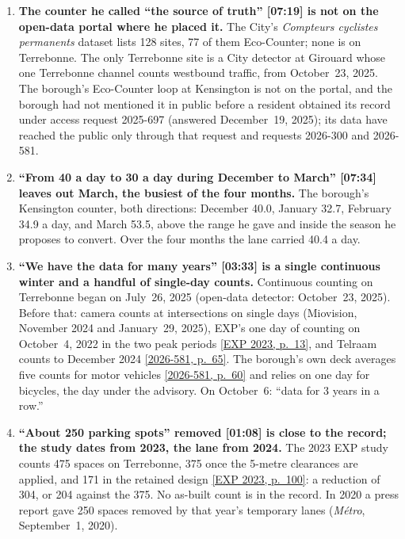 \documentclass[10pt,letterpaper]{article}
\newcommand{\repourl}{https://github.com/OpenMobilityData/Terrebonne-open-sources}
\newcommand{\pagesurl}{https://openmobilitydata.github.io/Terrebonne-access-requests}
\newcommand{\cliptime}[1]{\textsf{\small[#1]}}
\newcommand{\pgl}[2]{\href{\pagesurl/2026-581/raw/01_emails_mandate_counts.pdf\#page=#1}{\textsf{\small[2026-581, p.~#2]}}}
\newcommand{\pg}[1]{\pgl{#1}{#1}}
\newcommand{\exppg}[1]{\href{\repourl/blob/main/2023-exp-mobility-study/raw/EXP_Etude_de_mobilite_rue_de_Terrebonne_2023.pdf}{\textsf{\small[EXP 2023, p.~#1]}}}
\begin{document}
\begin{enumerate}[nosep,itemsep=0.3em,leftmargin=1.4em]
  \item \begin{minipage}[t]{\linewidth}\textbf{The counter he called ``the source of truth'' \cliptime{07:19} is not on the open-data portal where he placed it.} The City's \emph{Compteurs cyclistes permanents} dataset lists 128 sites, 77 of them Eco-Counter; none is on Terrebonne. The only Terrebonne site is a City detector at Girouard whose one Terrebonne channel counts westbound traffic, from October~23, 2025. The borough's Eco-Counter loop at Kensington is not on the portal, and the borough had not mentioned it in public before a resident obtained its record under access request 2025-697 (answered December~19, 2025); its data have reached the public only through that request and requests 2026-300 and 2026-581.\end{minipage}\vspace{0.35em}
  \item \begin{minipage}[t]{\linewidth}\textbf{``From 40 a day to 30 a day during December to March'' \cliptime{07:34} leaves out March, the busiest of the four months.} The borough's Kensington counter, both directions: December 40.0, January 32.7, February 34.9 a day, and March 53.5, above the range he gave and inside the season he proposes to convert. Over the four months the lane carried 40.4 a day.\end{minipage}\vspace{0.35em}
  \item \begin{minipage}[t]{\linewidth}\textbf{``We have the data for many years'' \cliptime{03:33} is a single continuous winter and a handful of single-day counts.} Continuous counting on Terrebonne began on July~26, 2025 (open-data detector: October~23, 2025). Before that: camera counts at intersections on single days (Miovision, November 2024 and January~29, 2025), EXP's one day of counting on October~4, 2022 in the two peak periods \exppg{13}, and Telraam counts to December 2024 \pg{65}. The borough's own deck averages five counts for motor vehicles \pg{60} and relies on one day for bicycles, the day under the advisory. On October~6: ``data for 3 years in a row.''\end{minipage}\vspace{0.35em}
  \item \begin{minipage}[t]{\linewidth}\textbf{``About 250 parking spots'' removed \cliptime{01:08} is close to the record; the study dates from 2023, the lane from 2024.} The 2023 EXP study counts 475 spaces on Terrebonne, 375 once the 5-metre clearances are applied, and 171 in the retained design \exppg{100}: a reduction of 304, or 204 against the 375. No as-built count is in the record. In 2020 a press report gave 250 spaces removed by that year's temporary lanes (\emph{Métro}, September~1, 2020).\end{minipage}\vspace{0.35em}

\end{enumerate}
\end{document}
